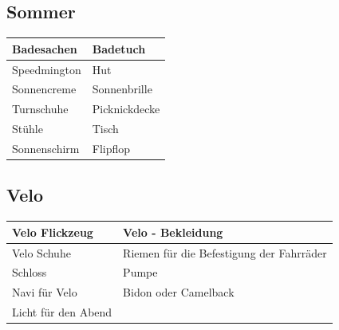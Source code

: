 \subsection{Sommer}
\begin{center}
\begin{tabular}{|p{5cm}|p{5cm}|}\hline
Badesachen & Badetuch \\ \hline
Speedmington & Hut \\ \hline
Sonnencreme & Sonnenbrille \\ \hline
Turnschuhe & Picknickdecke \\ \hline
Stühle & Tisch \\ \hline
Sonnenschirm & Flipflop \\ \hline
\end{tabular}
\end{center}
\newpage

\subsection{Velo}
\begin{center}
\begin{tabular}{|p{5cm}|p{5cm}|}\hline
Velo Flickzeug & Velo - Bekleidung \\ \hline
Velo Schuhe & Riemen für die Befestigung der Fahrräder \\ \hline
Schloss & Pumpe \\ \hline
Navi für Velo & Bidon oder Camelback \\ \hline
Licht für den Abend & \\ \hline
\end{tabular}
\end{center}
\newpage

